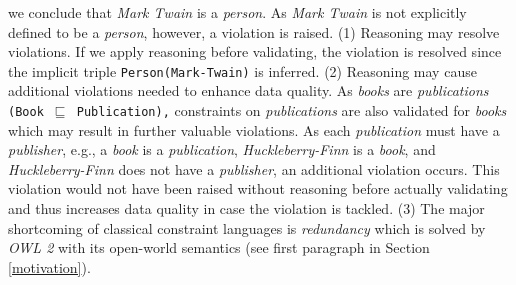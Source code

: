 \documentclass{acm_proc_article-sp}
\newcommand{\ms}[1]{%
  \texttt{#1}
}
\newcommand{\tb}[1]{\todo[size=\small, color=green!40]{\textbf{Thomas:} #1}}
\begin{document}
we conclude that \emph{Mark Twain} is a \emph{person}.
As \emph{Mark Twain} is not explicitly defined to be a \emph{person}, however, a violation is raised.
(1) Reasoning may resolve violations. If we apply reasoning before validating, the violation is resolved since the implicit triple {\small\ms{Person(Mark-Twain)}} is inferred. 
(2) Reasoning may cause additional violations needed to enhance data quality.
As \emph{books} are \emph{publications} {\small\ms{(Book $\sqsubseteq$ Publication),}} constraints on \emph{publications} are also validated for \emph{books} 
which may result in further valuable violations.
As each \emph{publication} must have a \emph{publisher}, e.g., a \emph{book} is a \emph{publication}, {\em Huckleberry-Finn} is a \emph{book}, and {\em Huckleberry-Finn} does not have a \emph{publisher}, 
an additional violation occurs.
This violation would not have been raised without reasoning before actually validating and 
thus increases data quality in case the violation is tackled.
(3) The major shortcoming of classical constraint languages is \emph{redundancy} which is solved by \emph{OWL 2} with its open-world semantics (see first paragraph in Section \ref{motivation}). 
\end{document}
